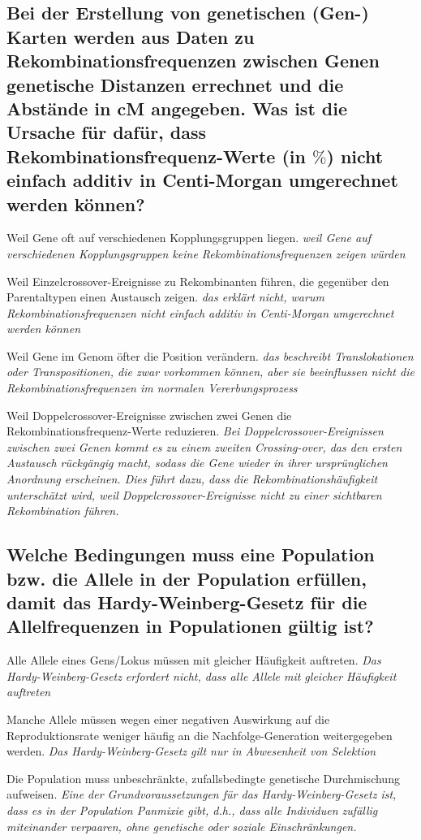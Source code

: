 \documentclass{article}
\newcommand{\cmark}{\ding{51}}%
\newcommand{\done}{\rlap{$\square$}{\raisebox{2pt}{\large\hspace{1pt}\cmark}}%
\hspace{-2.5pt}}
\begin{document}
\subsection*{Bei der Erstellung von genetischen (Gen-) Karten werden aus Daten zu
Rekombinationsfrequenzen zwischen Genen genetische Distanzen
errechnet und die Abstände in cM angegeben. Was ist die Ursache für
dafür, dass Rekombinationsfrequenz-Werte (in $\%$) nicht einfach additiv in
Centi-Morgan umgerechnet werden können?}
\begin{todolist}%
\item Weil Gene oft auf verschiedenen Kopplungsgruppen liegen. \textit{\scriptsize weil Gene auf verschiedenen Kopplungsgruppen keine Rekombinationsfrequenzen zeigen würden}
\item Weil Einzelcrossover-Ereignisse zu Rekombinanten führen, die
gegenüber den Parentaltypen einen Austausch zeigen. \textit{\scriptsize das erklärt nicht, warum Rekombinationsfrequenzen nicht einfach additiv in Centi-Morgan umgerechnet werden können}
\item Weil Gene im Genom öfter die Position verändern. \textit{\scriptsize das beschreibt Translokationen oder Transpositionen, die zwar vorkommen können, aber sie beeinflussen nicht die Rekombinationsfrequenzen im normalen Vererbungsprozess}
\item[\done] Weil Doppelcrossover-Ereignisse zwischen zwei Genen die
Rekombinationsfrequenz-Werte reduzieren. \textit{\scriptsize Bei Doppelcrossover-Ereignissen zwischen zwei Genen kommt es zu einem zweiten Crossing-over, das den ersten Austausch rückgängig macht, sodass die Gene wieder in ihrer ursprünglichen Anordnung erscheinen. Dies führt dazu, dass die Rekombinationshäufigkeit unterschätzt wird, weil Doppelcrossover-Ereignisse nicht zu einer sichtbaren Rekombination führen.}
\end{todolist}

\subsection*{Welche Bedingungen muss eine Population bzw. die Allele in der
Population erfüllen, damit das Hardy-Weinberg-Gesetz für die
Allelfrequenzen in Populationen gültig ist?}
\begin{todolist}%
\item Alle Allele eines Gens/Lokus müssen mit gleicher Häufigkeit auftreten. \textit{\scriptsize Das Hardy-Weinberg-Gesetz erfordert nicht, dass alle Allele mit gleicher Häufigkeit auftreten}
\item Manche Allele müssen wegen einer negativen Auswirkung auf die
Reproduktionsrate weniger häufig an die Nachfolge-Generation
weitergegeben werden. \textit{\scriptsize Das Hardy-Weinberg-Gesetz gilt nur in Abwesenheit von Selektion}
\item[\done] Die Population muss unbeschränkte, zufallsbedingte genetische
Durchmischung aufweisen. \textit{\scriptsize Eine der Grundvoraussetzungen für das Hardy-Weinberg-Gesetz ist, dass es in der Population Panmixie gibt, d.h., dass alle Individuen zufällig miteinander verpaaren, ohne genetische oder soziale Einschränkungen.}
\end{todolist}
\end{document}
